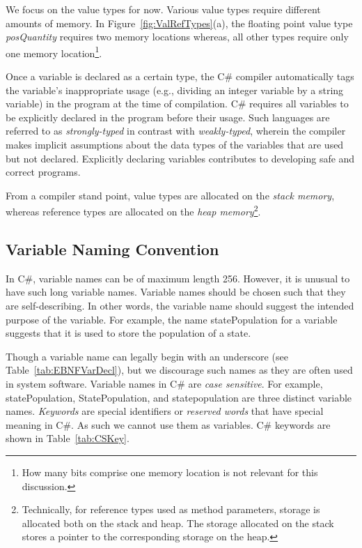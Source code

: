 We focus on the value types for now. Various value types require
different amounts of memory. In Figure~\ref{fig:ValRefTypes}(a),
the floating point value type \emph{posQuantity} requires two
memory locations whereas, all other types require only one memory
location\footnote{How many bits comprise one memory location is
not relevant for this discussion.}.

Once a variable is declared as a certain type, the C\# compiler
automatically tags the variable's inappropriate usage (e.g.,
dividing an integer variable by a string variable) in the program
at the time of compilation. C\# requires all variables to be
explicitly declared in the program before their usage. Such
languages are referred to as \emph{strongly-typed} in contrast
with \emph{weakly-typed}, wherein the compiler makes implicit
assumptions about the data types of the variables that are used
but not declared. Explicitly declaring variables contributes to
developing safe and correct programs.


From a compiler stand point, value types are allocated on the
\emph{stack memory}, whereas reference types are allocated on the
\emph{heap memory}\footnote{Technically, for reference types used
as method parameters, storage is allocated both on the stack and
heap. The storage allocated on the stack stores a pointer to the
corresponding storage on the heap.}.


\subsection{Variable Naming Convention}


In C\#, variable names can be of maximum length 256. However, it
is unusual to have such long variable names. Variable names should
be chosen such that they are self-describing. In other words, the
variable name should suggest the intended purpose of the variable.
For example, the name statePopulation for a variable suggests that
it is used to store the population of a state.

Though a variable name can legally begin with an underscore (see
Table~\ref{tab:EBNFVarDecl}), but we discourage such names as they
are often used in system software. Variable names in C\# are
\emph{case sensitive}. For example, statePopulation,
StatePopulation, and statepopulation are three distinct variable
names. \emph{Keywords} are special identifiers or \emph{reserved
words} that have special meaning in C\#. As such we cannot use
them as variables. C\# keywords are shown in
Table~\ref{tab:CSKey}.


